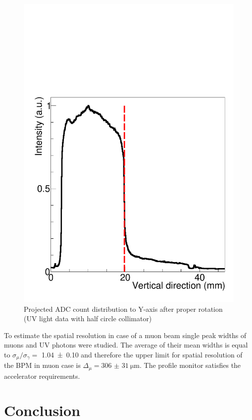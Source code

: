 \documentclass[preprint,3p,twocolumn]{elsarticle}
\begin{document}
\begin{figure}[htb]
	\begin{minipage}[t]{60mm}
		\includegraphics[width=1.3\textwidth, height=1.\textwidth]{figure/edge_image_w_uv_4_BH_axis.pdf}
	\end{minipage}
	\caption{ Projected ADC count distribution to Y-axis after proper rotation (UV light data with half circle collimator)}
	\label{fig:half_circle}
\end{figure}

To estimate the spatial resolution in case of a muon beam single peak widths of muons and UV photons were studied.
The average of their mean widths is equal to
$\sigma_{\mu} / \sigma_{\gamma} =$ \num{1.04 \pm 0.10}
and therefore the upper limit for spatial resolution of the BPM in muon case is
$\Delta_\mu = \SI{306(31)}{\um}$.
The profile monitor satisfies the accelerator requirements.


\section{Conclusion}
\end{document}
